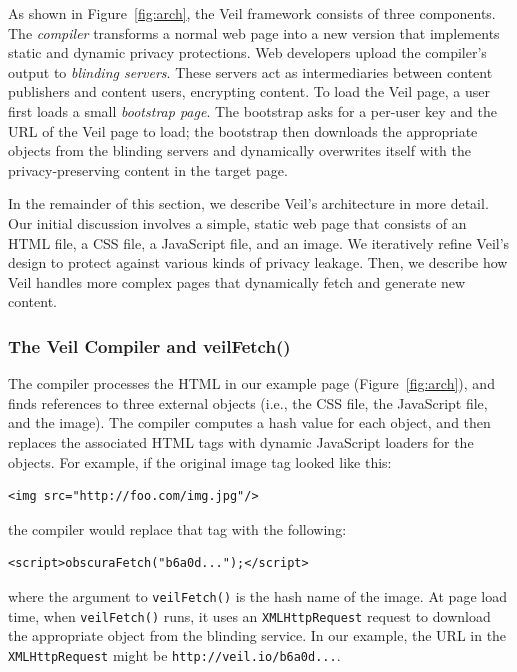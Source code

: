 As shown in Figure~\ref{fig:arch}, the Veil framework  %
consists of three components. The \emph{compiler}
transforms a normal web page into a new version
that implements static and dynamic privacy protections.
Web developers upload the compiler's output to
\emph{blinding servers}. These servers act as
intermediaries between content publishers and
content users, encrypting content. To load the Veil
page, a user first loads a small \emph{bootstrap page}.
The bootstrap asks for a per-user key and the
URL of the Veil page to load; the bootstrap then
downloads the appropriate objects from the blinding
servers and dynamically overwrites itself with
the privacy-preserving content in the target page.

In the remainder of this section, we describe Veil's
architecture in more detail. Our initial discussion
involves a simple, static web page that consists of
an HTML file, a CSS file, a JavaScript file, and an
image. We iteratively refine Veil's design to protect
against various kinds of privacy leakage. Then, we
describe how Veil handles more complex pages that
dynamically fetch and generate new content.


\subsubsection{The Veil Compiler and veilFetch()}
\label{sec:compiler}

The compiler processes the HTML in our example page (Figure~\ref{fig:arch}),
and finds references to three external objects (i.e.,
the CSS file, the JavaScript file, and the image).
The compiler computes a hash value for each object,
and then replaces the associated HTML tags with
dynamic JavaScript loaders for the objects. For
example, if the original image tag looked like this:
\begin{verbatim}
<img src="http://foo.com/img.jpg"/>
\end{verbatim}
the compiler would replace that tag with the following:
\begin{verbatim}
<script>obscuraFetch("b6a0d...");</script>
\end{verbatim}
where the argument to \texttt{veilFetch()} is the hash
name of the image. At page load time, when
\texttt{veilFetch()} runs, it uses an \texttt{XMLHttpRequest}
request to download the appropriate object from the
blinding service. In our example, the URL in the
\texttt{XMLHttpRequest} might be \texttt{http://veil.io/b6a0d...}.

